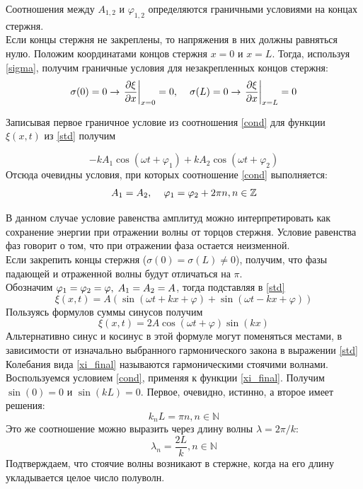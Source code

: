 \documentclass[a4paper,12pt]{article}
\begin{document}
	Соотношения между $A_{1,2}$ и $\varphi_{1,2}$ определяются граничными условиями на концах стержня.\\
	
	Если концы стержня не закреплены, то напряжения в них должны равняться нулю. Положим координатами концов стержня $x=0$ и $x=L$. Тогда, используя \eqref{sigma}, получим граничные условия для незакрепленных концов стержня:
	\begin{equation}
		\label{cond}
		\sigma(0)=0 \rightarrow \left.  \frac{\partial \xi}{\partial x}\right|_{x=0}=0, \hspace{4mm}
		\sigma(L)=0\rightarrow \left. \frac{\partial\xi}{\partial x}\right|_{x=L}=0
	\end{equation}
	
	Записывая первое граничное условие из соотношения \eqref{cond} для функции $\xi(x,t)$ из \eqref{std} получим
	
	\[
		-kA_1\cos(\omega t+\varphi_1)+kA_2\cos(\omega t+\varphi_2)
	\] 
	Отсюда очевидны условия, при которых соотношение \eqref{cond} выполняется:
	\[
		A_1=A_2, \hspace{4mm} \varphi_1=\varphi_2+2\pi n, n \in \mathbb{Z}
	\]
	
	В данном случае условие равенства амплитуд можно интерпретировать как сохранение энергии при отражении волны от торцов стержня. Условие равенства фаз говорит о том, что при отражении фаза остается неизменной.\\
	
	Если закрепить концы стержня ($\sigma(0)=\sigma(L)\neq 0$), получим, что фазы падающей и отраженной волны будут отличаться на $\pi$.\\
	
	Обозначим $\varphi_1=\varphi_2=\varphi,\hspace{1mm} A_1=A_2=A$, тогда подставляя в \eqref{std}
	\[
		\xi(x,t)=A(\sin(\omega t+kx+\varphi)+\sin(\omega t -kx +\varphi))
	\]
	Пользуясь формулов суммы синусов получим
	\begin{equation}
		\label{xi_final}
		\xi(x,t)=2A\cos(\omega t+\varphi)\sin(kx)
	\end{equation}	
	Альтернативно синус и косинус в этой формуле могут поменяться местами, в зависимости от изначально выбранного гармонического закона в выражении \eqref{std}\\
	
	Колебания вида \eqref{xi_final} называются гармоническими стоячими волнами.\\
	
	Воспользуемся условием \eqref{cond}, применяя к функции \eqref{xi_final}. Получим $\sin(0)=0$ и $\sin(kL)=0$. Первое, очевидно, истинно, а второе имеет решения:
	\[
		k_nL=\pi n, n \in \mathbb{N}
	\]
	Это же соотношение можно выразить через длину волны $\lambda = 2\pi/k$:
	\[
		\lambda_n=\frac{2L}{k}, n \in \mathbb{N}
	\]
	Подтверждаем, что стоячие волны возникают в стержне, когда на его длину укладывается целое число полуволн.\\
	
\end{document}
